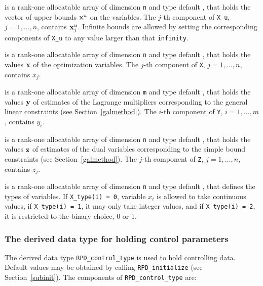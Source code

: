 \documentclass{galahad}
\newcommand{\packagename}{RPD}
\begin{document}
\begin{description}
 is a rank-one allocatable array of dimension {\tt n} and type
default \realdp, that holds
the vector of upper bounds ${\mathbf{x}}^{u}$ on the variables.
The $j$-th component of {\tt X\_u}, $j = 1, \ldots , n$,
contains ${\mathbf{x}}_{j}^{u}$.
Infinite bounds are allowed by setting the corresponding
components of {\tt X\_u} to any value larger than that {\tt infinity}.

 is a rank-one allocatable array of dimension {\tt n} and type
default \realdp,
that holds the values ${\mathbf{x}}$ of the optimization variables.
The $j$-th component of {\tt X}, $j = 1,  \ldots , n$, contains $x_{j}$.

 is a rank-one allocatable array of dimension {\tt m} and type
default \realdp, that holds
the values ${\mathbf{y}}$ of estimates  of the Lagrange multipliers
corresponding to the general linear constraints (see Section~\ref{galmethod}).
The $i$-th component of {\tt Y}, $i = 1,  \ldots ,  m$, contains $y_{i}$.

 is a rank-one allocatable array of dimension {\tt n} and type default
\realdp, that holds
the values ${\mathbf{z}}$ of estimates  of the dual variables
corresponding to the simple bound constraints (see Section~\ref{galmethod}).
The $j$-th component of {\tt Z}, $j = 1,  \ldots ,  n$, contains $z_{j}$.

 is a rank-one allocatable array of dimension {\tt n} and type
default \integer, that defines the types of variables. If {\tt X\_type(i) = 0},
variable $x_i$ is allowed to take continuous values, if {\tt X\_type(i) = 1},
it may only take integer values, and if {\tt X\_type(i) = 2}, it is
restricted to the binary choice, 0 or 1.

\end{description}


\subsubsection{The derived data type for holding control
 parameters}\label{typecontrol}
The derived data type
{\tt \packagename\_control\_type}
is used to hold controlling data. Default values may be obtained by calling
{\tt \packagename\_initialize}
(see Section~\ref{subinit}). The components of
{\tt \packagename\_control\_type}
are:
\end{document}
